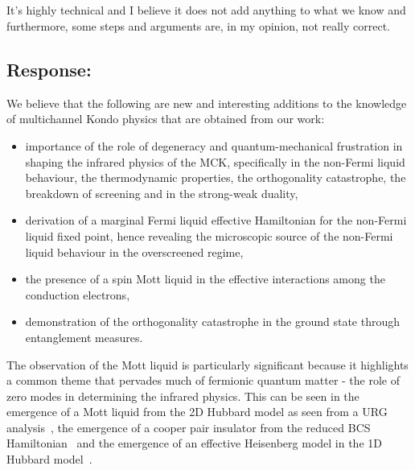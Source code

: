 \documentclass{article}
\newcommand{\response}[1]{{\color{blue}\subsection*{Response:}{#1}}}
\newcommand{\point}[1]{\subsection{}{#1}}
\begin{document}
\point{
It’s highly
technical and I believe it does not add anything to what we know and
furthermore, some steps and arguments are, in my opinion, not really
correct.
}

\response{
We believe that the following are new and interesting additions to the knowledge of multichannel Kondo physics that are obtained from our work:
\begin{itemize}
	\item importance of the role of degeneracy and quantum-mechanical frustration in shaping the infrared physics of the MCK, specifically in the non-Fermi liquid behaviour, the thermodynamic properties, the orthogonality catastrophe, the breakdown of screening and in the strong-weak duality,
	\item derivation of a marginal Fermi liquid effective Hamiltonian for the non-Fermi liquid fixed point, hence revealing the microscopic source of the non-Fermi liquid behaviour in the overscreened regime,
	\item the presence of a spin Mott liquid in the effective interactions among the conduction electrons,
	\item demonstration of the orthogonality catastrophe in the ground state through entanglement measures.
\end{itemize}
The observation of the Mott liquid is particularly significant because it highlights a common theme that pervades much of fermionic quantum matter - the role of zero modes in determining the infrared physics. This can be seen in the emergence of a Mott liquid from the 2D Hubbard model as seen from a URG analysis~\cite{anirbanmott1,anirbanmott2,mukherjeeMERG2022}, the emergence of a cooper pair insulator from the reduced BCS Hamiltonian~\cite{siddharthacpi} and the emergence of an effective Heisenberg model in the 1D Hubbard model~\cite{1dhubjhep}.
}



\end{document}
